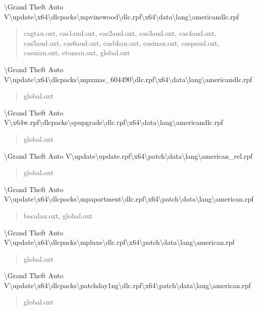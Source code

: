 \documentclass[]{scrartcl}
\begin{document}
\textbackslash{}Grand Theft Auto V\textbackslash{}update\textbackslash{}x64\textbackslash{}dlcpacks\textbackslash{}mpvinewood\textbackslash{}dlc.rpf\textbackslash{}x64\textbackslash{}data\textbackslash{}lang\textbackslash{}americandlc.rpf

\begin{quote}
   \ttfamily
   cagtau.oxt, cas1aud.oxt, cas2aud.oxt, cas3aud.oxt, cas4aud.oxt, cas5aud.oxt, cas6aud.oxt, casbkau.oxt, casinau.oxt, caspaud.oxt, casuiau.oxt, ctomau.oxt, global.oxt
\end{quote}

\textbackslash{}Grand Theft Auto V\textbackslash{}update\textbackslash{}x64\textbackslash{}dlcpacks\textbackslash{}mpxmas\_604490\textbackslash{}dlc.rpf\textbackslash{}x64\textbackslash{}data\textbackslash{}lang\textbackslash{}americandlc.rpf

\begin{quote}
   \ttfamily
   global.oxt
\end{quote}

\textbackslash{}Grand Theft Auto V\textbackslash{}x64w.rpf\textbackslash{}dlcpacks\textbackslash{}spupgrade\textbackslash{}dlc.rpf\textbackslash{}x64\textbackslash{}data\textbackslash{}lang\textbackslash{}americandlc.rpf

\begin{quote}
   \ttfamily
   global.oxt
\end{quote}

\textbackslash{}Grand Theft Auto V\textbackslash{}update\textbackslash{}update.rpf\textbackslash{}x64\textbackslash{}patch\textbackslash{}data\textbackslash{}lang\textbackslash{}american\_rel.rpf

\begin{quote}
   \ttfamily
   global.oxt
\end{quote}

\textbackslash{}Grand Theft Auto V\textbackslash{}update\textbackslash{}x64\textbackslash{}dlcpacks\textbackslash{}mpapartment\textbackslash{}dlc.rpf\textbackslash{}x64\textbackslash{}patch\textbackslash{}data\textbackslash{}lang\textbackslash{}american.rpf

\begin{quote}
   \ttfamily
   bacalau.oxt, global.oxt
\end{quote}

\textbackslash{}Grand Theft Auto V\textbackslash{}update\textbackslash{}x64\textbackslash{}dlcpacks\textbackslash{}mpluxe\textbackslash{}dlc.rpf\textbackslash{}x64\textbackslash{}patch\textbackslash{}data\textbackslash{}lang\textbackslash{}american.rpf

\begin{quote}
   \ttfamily
   global.oxt
\end{quote}

\textbackslash{}Grand Theft Auto V\textbackslash{}update\textbackslash{}x64\textbackslash{}dlcpacks\textbackslash{}patchday1ng\textbackslash{}dlc.rpf\textbackslash{}x64\textbackslash{}patch\textbackslash{}data\textbackslash{}lang\textbackslash{}american.rpf

\begin{quote}
   \ttfamily
   global.oxt
\end{quote}
\end{document}
